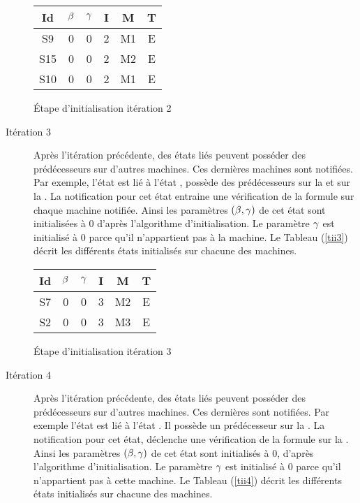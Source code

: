 \begin{Exemple}
\begin{description}
\begin{tableth}
	\centering
	\begin{tabular}{|*{6}{c|}}
		\hline
		Id	& $\beta{}$	&$\gamma{}$&	I&	M&	T\\
		\hline
		S9&	0&	0&	2&	M1&	E\\
		\hline
		S15&0&	0&	2&	M2&	E\\
		\hline
		S10&0&	0&	2&	M1&	E\\
		\hline
	\end{tabular}
	\caption{Étape d'initialisation itération 2}\label{tii2}
\end{tableth}
	\item[Itération 3]
Après l'itération précédente, des états liés peuvent posséder des prédécesseurs sur d'autres machines. Ces dernières machines  sont notifiées. Par exemple, l'état  est lié à l'état ,  possède des prédécesseurs sur la \mtwo{} et sur la \mtree{}. La notification pour cet état entraine une vérification de la formule sur chaque machine notifiée. Ainsi les paramètres $(\beta{}, \gamma{})$ de cet état sont initialisées à $0$ d'après l'algorithme d'initialisation. Le paramètre $\gamma{}$ est initialisé à $0$  parce qu'il n'appartient pas à la machine. Le Tableau (\ref{tii3}) décrit les différents états initialisés sur  chacune des machines.    		 
\begin{tableth}
	\centering
	\begin{tabular}{|*{6}{c|}}
		\hline
		Id	& $\beta{}$	&$\gamma{}$&	I&	M&	T\\
		\hline
		S7&	0&	0&	3&	M2&	E\\
		\hline
		S2&	0&	0&	3&	M3&	E\\
		\hline
	\end{tabular}
	\caption{Étape d'initialisation itération 3}\label{tii3}
\end{tableth}
	\item[Itération 4] Après l'itération précédente, des états liés peuvent posséder des prédécesseurs sur d'autres machines. Ces dernières sont notifiées. Par exemple l'état  est lié à l'état . Il possède un prédécesseur sur la \mtwo{}. La notification pour cet état, déclenche une vérification de la formule sur la \mtwo{}. Ainsi les paramètres $(\beta{}, \gamma{})$ de cet état sont initialisés à $0$, d'après l'algorithme d'initialisation. Le paramètre $\gamma{}$ est initialisé à $0$  parce qu'il n'appartient pas à cette machine. Le Tableau (\ref{tii4}) décrit les différents états initialisés sur  chacune des machines. 			  

\end{description}
\end{Exemple}
